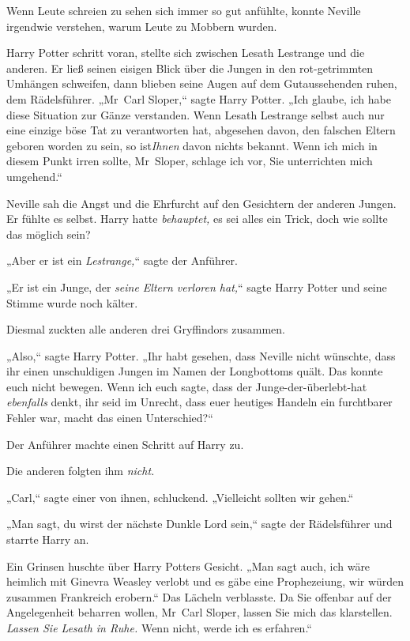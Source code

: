 {Wenn Leute schreien zu sehen sich immer so gut anfühlte, konnte Neville irgendwie verstehen, warum Leute zu Mobbern wurden.

Harry Potter schritt voran, stellte sich zwischen Lesath Lestrange und die anderen. Er ließ seinen eisigen Blick über die Jungen in den rot-getrimmten Umhängen schweifen, dann blieben seine Augen auf dem Gutaussehenden ruhen, dem Rädelsführer. „Mr~Carl Sloper,“ sagte Harry Potter. „Ich glaube, ich habe diese Situation zur Gänze verstanden. Wenn Lesath Lestrange selbst auch nur eine einzige böse Tat zu verantworten hat, abgesehen davon, den falschen Eltern geboren worden zu sein, so ist\emph{Ihnen} davon nichts bekannt. Wenn ich mich in diesem Punkt irren sollte, Mr~Sloper, schlage ich vor, Sie unterrichten mich umgehend.“

Neville sah die Angst und die Ehrfurcht auf den Gesichtern der anderen Jungen. Er fühlte es selbst. Harry hatte \emph{behauptet,} es sei alles ein Trick, doch wie sollte das möglich sein?

„Aber er ist ein \emph{Lestrange,}“ sagte der Anführer.

„Er ist ein Junge, der \emph{seine Eltern verloren hat,}“ sagte Harry Potter und seine Stimme wurde noch kälter.

Diesmal zuckten alle anderen drei Gryffindors zusammen.

„Also,“ sagte Harry Potter. „Ihr habt gesehen, dass Neville nicht wünschte, dass ihr einen unschuldigen Jungen im Namen der Longbottoms quält. Das konnte euch nicht bewegen. Wenn ich euch sagte, dass der Junge-der-überlebt-hat \emph{ebenfalls} denkt, ihr seid im Unrecht, dass euer heutiges Handeln ein furchtbarer Fehler war, macht das einen Unterschied?“

Der Anführer machte einen Schritt auf Harry zu.

Die anderen folgten ihm \emph{nicht.}

„Carl,“ sagte einer von ihnen, schluckend. „Vielleicht sollten wir gehen.“

„Man sagt, du wirst der nächste Dunkle Lord sein,“ sagte der Rädelsführer und starrte Harry an.

Ein Grinsen huschte über Harry Potters Gesicht. „Man sagt auch, ich wäre heimlich mit Ginevra Weasley verlobt und es gäbe eine Prophezeiung, wir würden zusammen Frankreich erobern.“ Das Lächeln verblasste. Da Sie offenbar auf der Angelegenheit beharren wollen, Mr~Carl Sloper, lassen Sie mich das klarstellen. \emph{Lassen Sie Lesath in Ruhe.} Wenn nicht, werde ich es erfahren.“

}
